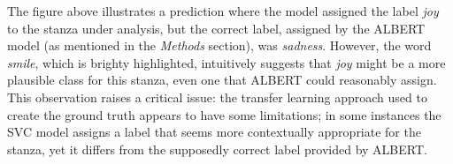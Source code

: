 The figure above illustrates a prediction where the model assigned the label \textit{joy} to the stanza under analysis, but the correct label, assigned by the ALBERT model (as mentioned in the \textit{Methods} section), was \textit{sadness}.
However, the word \textit{smile}, which is brighty highlighted, intuitively suggests that \textit{joy} might be a more plausible class for this stanza, even one that ALBERT could reasonably assign. 
This observation raises a critical issue: the transfer learning approach used to create the ground truth appears to have some limitations; in some instances the SVC model assigns a label that seems more contextually appropriate for the stanza, 
yet it differs from the supposedly correct label provided by ALBERT.\\

